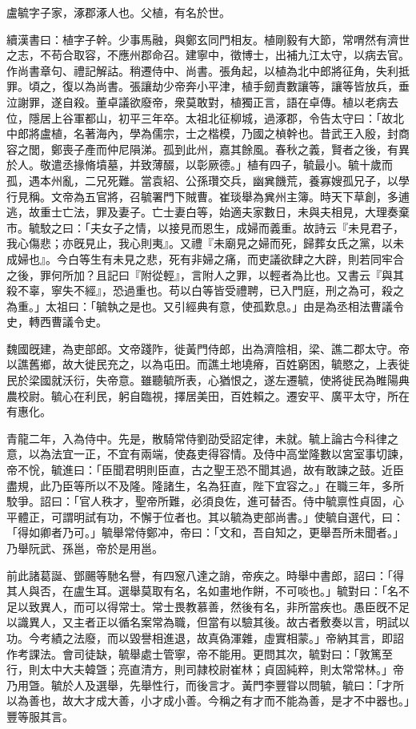 
\begin{pinyinscope}
盧毓字子家，涿郡涿人也。父植，有名於世。

續漢書曰：植字子幹。少事馬融，與鄭玄同門相友。植剛毅有大節，常喟然有濟世之志，不苟合取容，不應州郡命召。建寧中，徵博士，出補九江太守，以病去官。作尚書章句、禮記解詁。稍遷侍中、尚書。張角起，以植為北中郎將征角，失利抵罪。頃之，復以為尚書。張讓劫少帝奔小平津，植手劒責數讓等，讓等皆放兵，垂泣謝罪，遂自殺。董卓議欲廢帝，衆莫敢對，植獨正言，語在卓傳。植以老病去位，隱居上谷軍都山，初平三年卒。太祖北征柳城，過涿郡，令告太守曰：「故北中郎將盧植，名著海內，學為儒宗，士之楷模，乃國之楨幹也。昔武王入殷，封商容之閭，鄭喪子產而仲尼隕涕。孤到此州，嘉其餘風。春秋之義，賢者之後，有異於人。敬遣丞掾脩墳墓，并致薄醊，以彰厥德。」植有四子，毓最小。毓十歲而孤，遇本州亂，二兄死難。當袁紹、公孫瓚交兵，幽兾饑荒，養寡嫂孤兄子，以學行見稱。文帝為五官將，召毓署門下賊曹。崔琰舉為兾州主簿。時天下草創，多逋逃，故重士亡法，罪及妻子。亡士妻白等，始適夫家數日，未與夫相見，大理奏棄巿。毓駮之曰：「夫女子之情，以接見而恩生，成婦而義重。故詩云『未見君子，我心傷悲；亦旣見止，我心則夷』。又禮『未廟見之婦而死，歸葬女氏之黨，以未成婦也』。今白等生有未見之悲，死有非婦之痛，而吏議欲肆之大辟，則若同牢合𢀿之後，罪何所加？且記曰『附從輕』，言附人之罪，以輕者為比也。又書云『與其殺不辜，寧失不經』，恐過重也。苟以白等皆受禮聘，已入門庭，刑之為可，殺之為重。」太祖曰：「毓執之是也。又引經典有意，使孤歎息。」由是為丞相法曹議令史，轉西曹議令史。

魏國旣建，為吏部郎。文帝踐阼，徙黃門侍郎，出為濟陰相，梁、譙二郡太守。帝以譙舊鄉，故大徙民充之，以為屯田。而譙土地墝瘠，百姓窮困，毓愍之，上表徙民於梁國就沃衍，失帝意。雖聽毓所表，心猶恨之，遂左遷毓，使將徙民為睢陽典農校尉。毓心在利民，躬自臨視，擇居美田，百姓賴之。遷安平、廣平太守，所在有惠化。

青龍二年，入為侍中。先是，散騎常侍劉劭受詔定律，未就。毓上論古今科律之意，以為法宜一正，不宜有兩端，使姦吏得容情。及侍中高堂隆數以宮室事切諫，帝不恱，毓進曰：「臣聞君明則臣直，古之聖王恐不聞其過，故有敢諫之鼓。近臣盡規，此乃臣等所以不及隆。隆諸生，名為狂直，陛下宜容之。」在職三年，多所駮爭。詔曰：「官人秩才，聖帝所難，必須良佐，進可替否。侍中毓禀性貞固，心平體正，可謂明試有功，不懈于位者也。其以毓為吏部尚書。」使毓自選代，曰：「得如卿者乃可。」毓舉常侍鄭冲，帝曰：「文和，吾自知之，更舉吾所未聞者。」乃舉阮武、孫邕，帝於是用邕。

前此諸葛誕、鄧颺等馳名譽，有四䆫八達之誚，帝疾之。時舉中書郎，詔曰：「得其人與否，在盧生耳。選舉莫取有名，名如畫地作餅，不可啖也。」毓對曰：「名不足以致異人，而可以得常士。常士畏教慕善，然後有名，非所當疾也。愚臣旣不足以識異人，又主者正以循名案常為職，但當有以驗其後。故古者敷奏以言，明試以功。今考績之法廢，而以毀譽相進退，故真偽渾雜，虛實相蒙。」帝納其言，即詔作考課法。會司徒缺，毓舉處士管寧，帝不能用。更問其次，毓對曰：「敦篤至行，則太中大夫韓曁；亮直清方，則司隷校尉崔林；貞固純粹，則太常常林。」帝乃用曁。毓於人及選舉，先舉性行，而後言才。黃門李豐甞以問毓，毓曰：「才所以為善也，故大才成大善，小才成小善。今稱之有才而不能為善，是才不中器也。」豐等服其言。


\end{pinyinscope}
